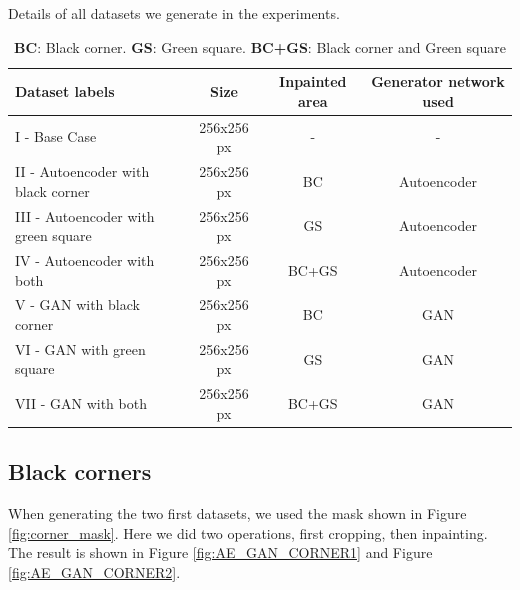 \begin{table}[h]
\centering
\footnotesize
\caption{Details of all datasets we generate in the experiments.} 
\caption*{\small \textbf{BC}: Black corner. \textbf{GS}: Green square. \textbf{BC+GS}: Black corner and Green square}
\begin{center}
\begin{tabular}{lccc}
\toprule
{Dataset labels} & {Size} & {Inpainted area} & {Generator network used} \\ 
\midrule
I    - Base Case                       & 256x256 px         & -        & -                   \\
II   - Autoencoder with black corner   & 256x256 px         & BC       & Autoencoder         \\
III  - Autoencoder with green square   & 256x256 px         & GS       & Autoencoder         \\
IV   - Autoencoder with both           & 256x256 px         & BC+GS    & Autoencoder         \\
V    - GAN with black corner           & 256x256 px         & BC       & GAN                 \\
VI   - GAN with green square   		   & 256x256 px         & GS       & GAN                 \\
VII  - GAN with both                   & 256x256 px         & BC+GS    & GAN                 \\
\bottomrule
\end{tabular}%
\end{center}
\label{tab:datasets}
\end{table}

\FloatBarrier
\subsection{Black corners}
When generating the two first datasets, we used the mask shown in Figure \ref{fig:corner_mask}. Here we did two operations, first cropping, then inpainting. The result is shown in Figure \ref{fig:AE_GAN_CORNER1} and Figure \ref{fig:AE_GAN_CORNER2}.


